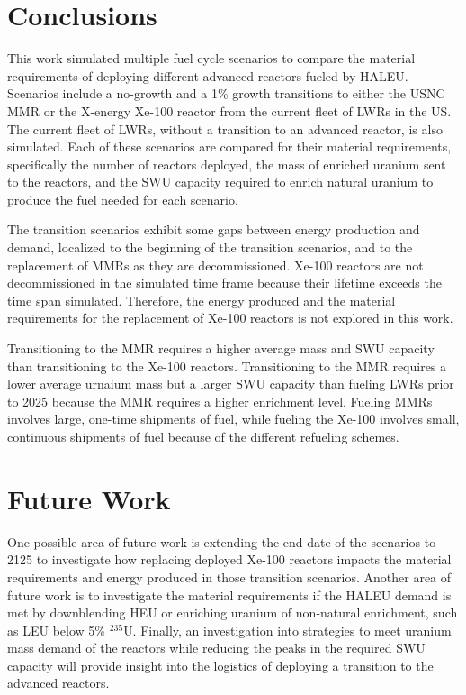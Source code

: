 \section{Conclusions}
This work simulated multiple fuel cycle scenarios to compare the 
material requirements of deploying different advanced reactors fueled 
by \gls{HALEU}. Scenarios include a no-growth and a 1\% growth 
transitions to either the \gls{USNC} \gls{MMR} or the X-energy Xe-100 
reactor from the current fleet of \glspl{LWR} in the US. The current 
fleet of \glspl{LWR}, without a transition to an advanced reactor, is 
also simulated. Each of these scenarios are compared for their material 
requirements, specifically the number of reactors deployed, the mass 
of enriched uranium sent to the reactors, and the \gls{SWU} capacity 
required to enrich natural uranium to produce the fuel needed for 
each scenario. 

The transition scenarios exhibit some gaps between  
energy production and demand, localized to the beginning of the 
transition
scenarios, and to the replacement of \glspl{MMR} as they are decommissioned. 
Xe-100 reactors are not decommissioned in the simulated time frame because 
their lifetime exceeds the time span simulated. Therefore, the 
energy produced and the material requirements for the replacement of 
Xe-100 reactors is not explored in this work. 

Transitioning to the \gls{MMR} requires 
a higher average mass and \gls{SWU} capacity than transitioning to the 
Xe-100 reactors. Transitioning to the \gls{MMR} requires a lower average 
urnaium mass but a larger \gls{SWU} capacity than fueling \glspl{LWR} prior 
to 2025 because the \gls{MMR} requires a higher enrichment level. 
Fueling \glspl{MMR} involves large, one-time shipments of fuel, while 
fueling the Xe-100 involves small, continuous shipments of fuel 
because of the different refueling schemes.

\section{Future Work}
One possible area of future work is extending the end date 
of the scenarios to 2125 to investigate how replacing deployed Xe-100 
reactors impacts the material requirements and energy produced in those 
transition scenarios. Another area of future work is to investigate the 
material requirements if the \gls{HALEU} demand is met by downblending 
\gls{HEU} or enriching uranium of non-natural enrichment, such as 
\gls{LEU} below 5\% $^{235}$U. Finally, an investigation into strategies 
to meet uranium mass demand of the reactors while reducing the peaks in 
the required \gls{SWU} capacity will provide insight into the logistics 
of deploying a transition to the advanced reactors.

